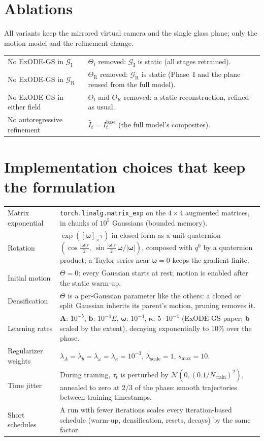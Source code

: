 \documentclass[10pt,a4paper]{article}
\newcommand{\GI}{\mathcal G_{\mathrm I}}
\newcommand{\GR}{\mathcal G_{\mathrm R}}
\newcommand{\bom}{\boldsymbol\omega}
\newcommand{\bka}{\boldsymbol\kappa}
\newcommand{\Ib}{I^{\mathrm{base}}}
\begin{document}
\section{Ablations}
All variants keep the mirrored virtual camera and the single glass plane; only the motion model and the refinement change.

\begin{tabularx}{\textwidth}{@{}lX@{}}
\toprule
No ExODE-GS in $\GI$ & $\Theta_{\mathrm I}$ removed: $\GI$ is static (all stages retrained). \\
No ExODE-GS in $\GR$ & $\Theta_{\mathrm R}$ removed: $\GR$ is static (Phase~I and the plane reused from the full model). \\
No ExODE-GS in either field & $\Theta_{\mathrm I}$ and $\Theta_{\mathrm R}$ removed: a static reconstruction, refined as usual. \\
No autoregressive refinement & $\hat I_t=\Ib_t$ (the full model's composites). \\ \bottomrule
\end{tabularx}

\section{Implementation choices that keep the formulation}
\begin{tabularx}{\textwidth}{@{}lX@{}}
\toprule
Matrix exponential & \texttt{torch.linalg.matrix\_exp} on the $4\times4$ augmented matrices, in chunks of $10^5$ Gaussians (bounded memory). \\
Rotation & $\exp([\bom]_\times\tau)$ in closed form as a unit quaternion $(\cos\frac{|\bom|\tau}2,\ \sin\frac{|\bom|\tau}2\,\bom/|\bom|)$, composed with $q^0$ by a quaternion product; a Taylor series near $\bom=0$ keeps the gradient finite. \\
Initial motion & $\Theta=0$: every Gaussian starts at rest; motion is enabled after the static warm-up. \\
Densification & $\Theta$ is a per-Gaussian parameter like the others: a cloned or split Gaussian inherits its parent's motion, pruning removes it. \\
Learning rates & $\mathbf A$: $10^{-5}$, $\mathbf b$: $10^{-4}E$, $\bom$: $10^{-4}$, $\bka$: $5\cdot10^{-4}$ (ExODE-GS paper; $\mathbf b$ scaled by the extent), decaying exponentially to 10\% over the phase. \\
Regularizer weights & $\lambda_A=\lambda_b=\lambda_\omega=\lambda_\kappa=10^{-3}$, $\lambda_{\mathrm{scale}}=1$, $s_{\max}=10$. \\
Time jitter & During training, $\tau_t$ is perturbed by $\mathcal N(0,(0.1/N_{\mathrm{train}})^2)$, annealed to zero at 2/3 of the phase: smooth trajectories between training timestamps. \\
Short schedules & A run with fewer iterations scales every iteration-based schedule (warm-up, densification, resets, decays) by the same factor. \\ \bottomrule
\end{tabularx}
\end{document}

